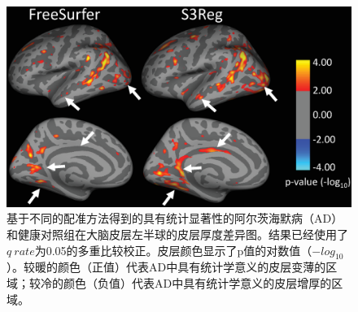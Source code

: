 \begin{figure}[t]
	\centering
	\includegraphics[width=0.8\linewidth]{figure/ADVSHC.eps}
	\caption{基于不同的配准方法得到的具有统计显著性的阿尔茨海默病（AD）和健康对照组在大脑皮层左半球的皮层厚度差异图。结果已经使用了$q~rate$为0.05的多重比较校正。皮层颜色显示了p值的对数值（$-log_{10}$）。较暖的颜色（正值）代表AD中具有统计学意义的皮层变薄的区域；较冷的颜色（负值）代表AD中具有统计学意义的皮层增厚的区域。}
	\label{fig:ADVSHC}
\end{figure}

